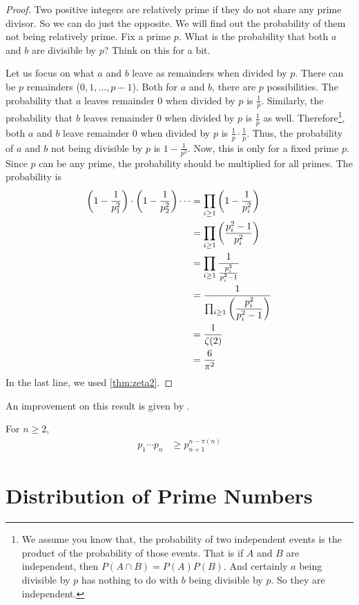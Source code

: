 \begin{proof}
	Two positive integers are relatively prime if they do not share any prime divisor. So we can do just the opposite. We will find out the probability of them not being relatively prime. Fix a prime $p$. What is the probability that both $a$ and $b$ are divisible by $p$? Think on this for a bit.

	Let us focus on what $a$ and $b$ leave as remainders when divided by $p$. There can be $p$ remainders ($0,1,\ldots,p-1$). Both for $a$ and $b$, there are $p$ possibilities. The probability that $a$ leaves remainder $0$ when divided by $p$ is $\frac{1}{p}$. Similarly, the probability that $b$ leaves remainder $0$ when divided by $p$ is $\frac{1}{p}$ as well. Therefore\footnote{We assume you know that, the probability of two independent events is the product of the probability of those events. That is if $A$ and $B$ are independent, then $P(A\cap B)=P(A)P(B)$. And certainly $a$ being divisible by $p$ has nothing to do with $b$ being divisible by $p$. So they are independent.}, both $a$ and $b$ leave remainder $0$ when divided by $p$ is $\frac{1}{p}\cdot\frac{1}{p}$. Thus, the probability of $a$ and $b$ not being divisible by $p$ is $1-\frac{1}{p^2}$. Now, this is only for a fixed prime $p$. Since $p$ can be any prime, the probability should be multiplied for all primes. The probability is
		\begin{align*}
			\left(1-\dfrac{1}{p_1^2}\right)\cdot\left(1-\dfrac{1}{p_2^2}\right)\cdots
			& = \prod_{i\geq1}\left(1-\dfrac{1}{p_i^2}\right)\\
			& = \prod_{i\geq1}\left(\dfrac{p_i^2-1}{p_i^2}\right)\\
			& = \prod_{i\geq1}\dfrac{1}{\frac{p_i^2}{p_i^2-1}}\\
			& = \dfrac{1}{\prod_{i\geq1}\left(\dfrac{p_i^2}{p_i^2-1}\right)}\\
			& = \dfrac{1}{\zeta(2)}\\
			& = \dfrac{6}{\pi^2}
		\end{align*}
	In the last line, we used \autoref{thm:zeta2}.
\end{proof}

An improvement on this result is given by \textcite{panaitopol_2000}.
	\begin{theorem}
		For $n\geq 2$,
			\begin{align*}
				p_{1}\cdots p_{n}
					& \geq p_{n+1}^{n-\pi(n)}
			\end{align*}
	\end{theorem}
\section{Distribution of Prime Numbers}



